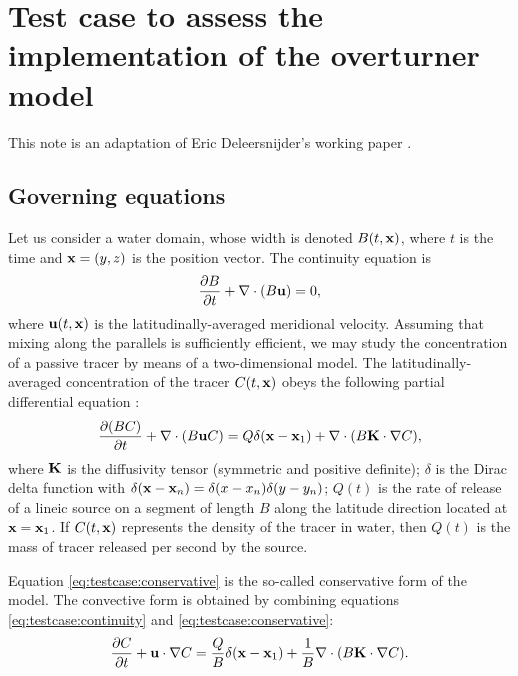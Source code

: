 \section*{Test case to assess the implementation of the overturner model}
This note is an adaptation of Eric Deleersnijder's working paper \cite{deleersnijder2011test}.

\subsection*{Governing equations}
Let us consider a water domain, whose width is denoted $B(t,\mathbf{x})$, where $t$ is the time and $\mathbf{x} = (y,z)$ is the position vector. The continuity equation is
\begin{equation} \label{eq:testcase:continuity}
	\frac{\partial B}{\partial t} + \nabla \cdot (B\mathbf{u}) = 0,
\end{equation}
where $\mathbf{u}(t,\mathbf{x})$ is the latitudinally-averaged meridional velocity. Assuming that mixing along the parallels is sufficiently efficient, we may study the concentration of a passive tracer by means of a two-dimensional model. The latitudinally-averaged concentration of the tracer $C(t,\mathbf{x})$ obeys the following partial differential equation :
\begin{equation} \label{eq:testcase:conservative}
	\frac{\partial (BC)}{\partial t} + \nabla \cdot (B \mathbf{u} C) = Q\delta(\mathbf{x} - \mathbf{x}_1) + \nabla \cdot (B\mathbf{K} \cdot \nabla C), 
\end{equation}
where $\mathbf{K}$ is the diffusivity tensor (symmetric and positive definite); $\delta$ is the Dirac delta function with $\delta(\mathbf{x}-\mathbf{x}_n) = \delta(x-x_n)\delta(y-y_n)$; $Q(t)$ is the rate of release of a lineic source on a segment of length $B$ along the latitude direction located at $\mathbf{x} = \mathbf{x}_1$. If $C(t,\mathbf x)$ represents the 
density of the tracer in water, then $Q(t)$ is the mass of tracer released per second by the source.

Equation \eqref{eq:testcase:conservative} is the so-called conservative form of the model. The convective form is obtained by combining equations \eqref{eq:testcase:continuity} and \eqref{eq:testcase:conservative}:
\begin{equation}  \label{eq:testcase:convective}
	\frac{\partial C}{\partial t} + \mathbf{u} \cdot \nabla C = \frac{Q}{B} \delta(\mathbf{x} - \mathbf{x}_1) + \frac{1}{B} \nabla \cdot (B\mathbf{K} \cdot \nabla C).
\end{equation}

